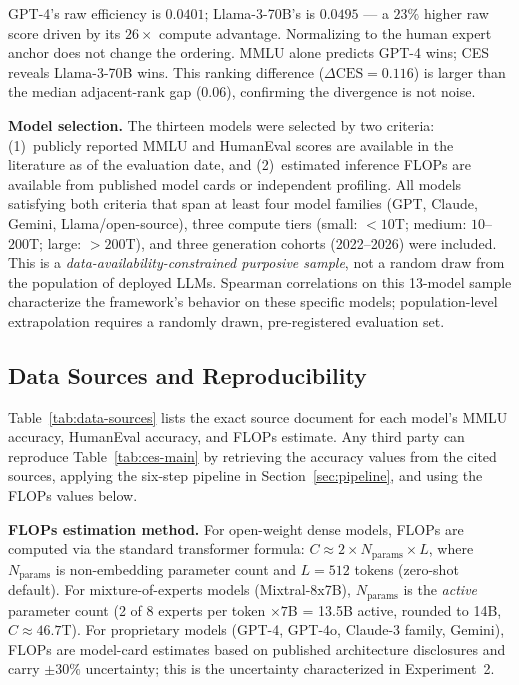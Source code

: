 \documentclass[12pt]{article}
\begin{document}
GPT-4's raw efficiency is $0.0401$; Llama-3-70B's is $0.0495$ --- a $23\%$ higher raw score driven by its $26\times$ compute advantage. Normalizing to the human expert anchor does not change the ordering. MMLU alone predicts GPT-4 wins; CES reveals Llama-3-70B wins. This ranking difference ($\Delta\text{CES} = 0.116$) is larger than the median adjacent-rank gap (0.06), confirming the divergence is not noise.

\bigskip

\noindent\textbf{Model selection.} The thirteen models were selected by two criteria: (1)~publicly reported MMLU and HumanEval scores are available in the literature as of the evaluation date, and (2)~estimated inference FLOPs are available from published model cards or independent profiling. All models satisfying both criteria that span at least four model families (GPT, Claude, Gemini, Llama/open-source), three compute tiers (small: $<10$T; medium: $10$--$200$T; large: $>200$T), and three generation cohorts (2022--2026) were included. This is a \textit{data-availability-constrained purposive sample}, not a random draw from the population of deployed LLMs. Spearman correlations on this 13-model sample characterize the framework's behavior on these specific models; population-level extrapolation requires a randomly drawn, pre-registered evaluation set.

\subsection{Data Sources and Reproducibility}
\label{sec:data-sources}

Table~\ref{tab:data-sources} lists the exact source document for each model's MMLU accuracy, HumanEval accuracy, and FLOPs estimate. Any third party can reproduce Table~\ref{tab:ces-main} by retrieving the accuracy values from the cited sources, applying the six-step pipeline in Section~\ref{sec:pipeline}, and using the FLOPs values below.

\noindent\textbf{FLOPs estimation method.} For open-weight dense models, FLOPs are computed via the standard transformer formula: $C \approx 2 \times N_{\text{params}} \times L$, where $N_{\text{params}}$ is non-embedding parameter count and $L = 512$ tokens (zero-shot default). For mixture-of-experts models (Mixtral-8x7B), $N_{\text{params}}$ is the \textit{active} parameter count (2 of 8 experts per token $\times 7$B = 13.5B active, rounded to 14B, $C \approx 46.7$T). For proprietary models (GPT-4, GPT-4o, Claude-3 family, Gemini), FLOPs are model-card estimates based on published architecture disclosures and carry $\pm 30\%$ uncertainty; this is the uncertainty characterized in Experiment~2.
\end{document}
